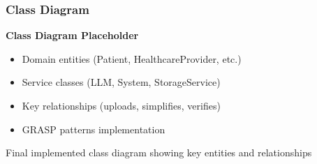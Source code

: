 \documentclass{beamer}
\begin{document}
\begin{frame}
  \frametitle{Class Diagram}
  
  \begin{center}
    \large{\textbf{Class Diagram Placeholder}}
    
    \vspace{1cm}
    \begin{itemize}
      \item Domain entities (Patient, HealthcareProvider, etc.)
      \item Service classes (LLM, System, StorageService)
      \item Key relationships (uploads, simplifies, verifies)
      \item GRASP patterns implementation
    \end{itemize}
  \end{center}
  
  \begin{center}
    \footnotesize{Final implemented class diagram showing key entities and relationships}
  \end{center}
\end{frame}

\end{document}
